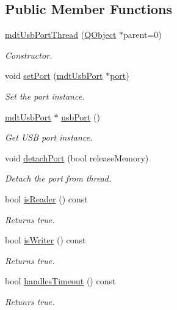 \subsection*{Public Member Functions}
\begin{DoxyCompactItemize}
\item 
\hyperlink{classmdt_usb_port_thread_aaf4e5883224f05d80132b31a921ac899}{mdt\-Usb\-Port\-Thread} (\hyperlink{class_q_object}{Q\-Object} $\ast$parent=0)
\begin{DoxyCompactList}\small\item\em Constructor. \end{DoxyCompactList}\item 
void \hyperlink{classmdt_usb_port_thread_a1661f362e2d772c1524f09daa6da3f15}{set\-Port} (\hyperlink{classmdt_usb_port}{mdt\-Usb\-Port} $\ast$\hyperlink{classmdt_port_thread_a97bff8cf6aca37d8858cc4e5c9294cae}{port})
\begin{DoxyCompactList}\small\item\em Set the port instance. \end{DoxyCompactList}\item 
\hyperlink{classmdt_usb_port}{mdt\-Usb\-Port} $\ast$ \hyperlink{classmdt_usb_port_thread_aaa8e1ce181489dbae57c81b42dc6ad62}{usb\-Port} ()
\begin{DoxyCompactList}\small\item\em Get U\-S\-B port instance. \end{DoxyCompactList}\item 
void \hyperlink{classmdt_usb_port_thread_a99070e7dba4bd7939b054cddbd66979f}{detach\-Port} (bool release\-Memory)
\begin{DoxyCompactList}\small\item\em Detach the port from thread. \end{DoxyCompactList}\item 
bool \hyperlink{classmdt_usb_port_thread_aed82b57c84745f1e2391750697db1022}{is\-Reader} () const 
\begin{DoxyCompactList}\small\item\em Returns true. \end{DoxyCompactList}\item 
bool \hyperlink{classmdt_usb_port_thread_a74258f300967b5dea1fbfa9a0ccab38a}{is\-Writer} () const 
\begin{DoxyCompactList}\small\item\em Returns true. \end{DoxyCompactList}\item 
bool \hyperlink{classmdt_usb_port_thread_aeaa2dabc53e57f6b7cf7077d113c7f40}{handles\-Timeout} () const 
\begin{DoxyCompactList}\small\item\em Retunrs true. \end{DoxyCompactList}\end{DoxyCompactItemize}
